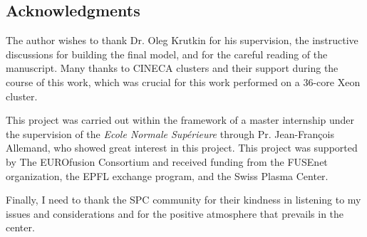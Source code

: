 \documentclass[11pt,a4paper,openany]{report}
\begin{document}
\begin{multicols}{2}
    \chapter*{Acknowledgments}

    The author wishes to thank Dr. Oleg Krutkin for his supervision, the instructive discussions for building the final model, and for the careful reading of the manuscript. Many thanks to CINECA clusters and their support during the course of this work, which was crucial for this work performed on a 36-core Xeon cluster.

    This project was carried out within the framework of a master internship under the supervision of the \textit{Ecole Normale Supérieure} through Pr. Jean-François Allemand, who showed great interest in this project. This project was supported by The EUROfusion Consortium and received funding from the FUSEnet organization, the EPFL exchange program, and the Swiss Plasma Center.

    Finally, I need to thank the SPC community for their kindness in listening to my issues and considerations and for the positive atmosphere that prevails in the center.

    \nocite{*}
    \printbibliography
\end{multicols}
\end{document}
